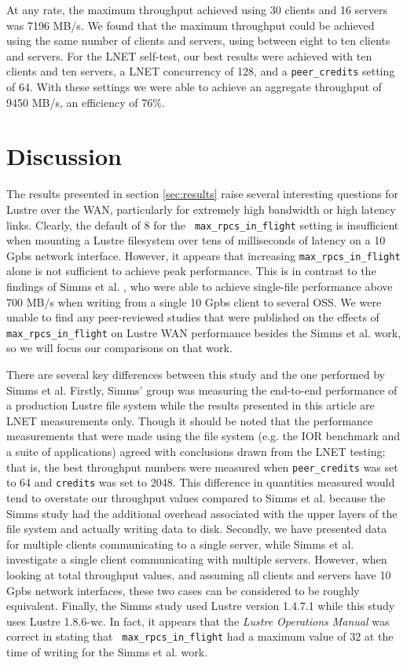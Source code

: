 \documentclass[]{sig-alternate}
\begin{document}
At any rate, the maximum throughput achieved using 30 clients and 16 servers was 7196 MB/s. We found that the
maximum throughput could be achieved using the same number of clients and servers, using between eight to ten
clients and servers. For the LNET self-test, our best results were achieved with ten clients and ten servers, a
LNET concurrency of 128, and a {\tt peer\_credits} setting of 64. With these settings we were able to achieve
an aggregate throughput of 9450 MB/s, an efficiency of 76\%.

\section{Discussion}\label{sec:discussion} 

The results presented in section \ref{sec:results} raise several interesting questions for Lustre over the
WAN, particularly for extremely high bandwidth or high latency links. Clearly, the default of 8 for the {\tt
  max\_rpcs\_in\_flight} setting is insufficient when mounting a Lustre filesystem over tens of milliseconds
of latency on a 10 Gpbs network interface. However, it appears that increasing {\tt max\_rpcs\_in\_flight}
alone is not sufficient to achieve peak performance. This is in contrast to the findings of Simms et
al. \cite{simms2007}, who were able to achieve single-file performance above 700 MB/s when writing from a
single 10 Gpbs client to several OSS. We were unable to find any peer-reviewed studies that were published on
the effects of {\tt max\_rpcs\_in\_flight} on Lustre WAN performance besides the Simms et al. work, so we will
focus our comparisons on that work.

There are several key differences between this study and the one performed by Simms et al. Firstly, Simms'
group was measuring the end-to-end performance of a production Lustre file system while the results presented
in this article are LNET measurements only. Though it should be noted that the performance measurements that
were made using the file system (e.g. the IOR benchmark and a suite of applications) agreed with conclusions
drawn from the LNET testing; that is, the best throughput numbers were measured when {\tt peer\_credits} was
set to 64 and {\tt credits} was set to 2048. This difference in quantities measured would tend to overstate
our throughput values compared to Simms et al. because the Simms study had the additional overhead associated
with the upper layers of the file system and actually writing data to disk. Secondly, we have presented data
for multiple clients communicating to a single server, while Simms et al. investigate a single client
communicating with multiple servers. However, when looking at total throughput values, and assuming all
clients and servers have 10 Gpbs network interfaces, these two cases can be considered to be roughly
equivalent. Finally, the Simms study used Lustre version 1.4.7.1 while this study uses Lustre 1.8.6-wc. In
fact, it appears that the {\it Lustre Operations Manual} was correct in stating that {\tt
  max\_rpcs\_in\_flight} had a maximum value of 32 at the time of writing for the Simms et al. work.
\end{document}
